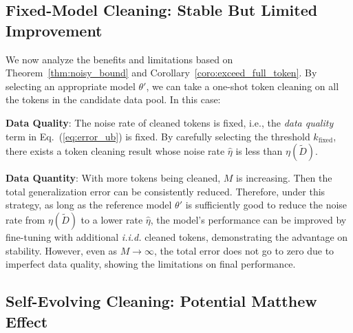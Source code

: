 \subsection{Fixed-Model Cleaning: Stable But Limited Improvement}\label{sec:theory_fix_model}

We now analyze the benefits and limitations based on Theorem~\ref{thm:noisy_bound} and Corollary~\ref{coro:exceed_full_token}.
By selecting an appropriate model $\theta'$, we can take a one-shot token cleaning on all the tokens in the candidate data pool. In this case:
\squishlist 
\item \textbf{Data Quality}: The noise rate of cleaned tokens is fixed, i.e., the \textit{data quality} term in Eq.~(\ref{eq:error_ub}) is fixed. By carefully selecting the threshold $k_{\text{fixed}}$, there exists a token cleaning result whose noise rate $\hat \eta$ is less than $\eta(\widetilde{D})$.

\item \textbf{Data Quantity}: With more tokens being cleaned, $M$ is increasing. Then the total generalization error can be consistently reduced. 
\squishend
Therefore, under this strategy, as long as the reference model $\theta'$ is sufficiently good to reduce the noise rate from $\eta(\widetilde{D})$ to a lower rate $\hat{\eta}$, the model's performance can be improved by fine-tuning with additional \textit{i.i.d.} cleaned tokens, demonstrating the advantage on stability. However, even as $M \rightarrow \infty$, the total error does not go to zero due to imperfect data quality, showing the limitations on final performance.




\subsection{Self-Evolving Cleaning: Potential Matthew Effect} \label{sec:matthew_effect}

